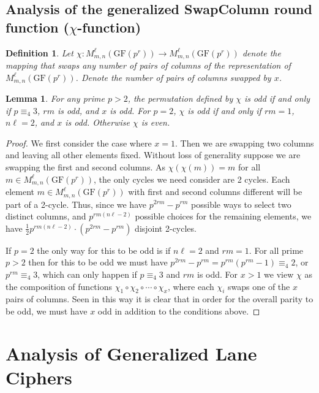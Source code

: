 \documentclass[11pt]{amsart}
\newcommand{\GF}{\mathrm{GF}}
\newtheorem{definition}{{\bf Definition}}
\newtheorem{lemma}[theorem]{{\bf Lemma }}
\begin{document}
\subsection{{\bf Analysis of the generalized SwapColumn round function} ($\chi$-function) }

\begin{definition}
Let $\chi : M^\ell_{m,n}(\GF(p^r)) \to M^\ell_{m,n}(\GF(p^r))$ denote the mapping that swaps any number of pairs of columns of the representation of $M^\ell_{m,n}(\GF(p^r))$. Denote the number of pairs of columns swapped by $x$.
\end{definition}

\begin{lemma}
For any prime $p > 2$, the permutation defined by $\chi$ is odd if and only if $p \equiv_4 3$, $rm$ is odd, and $x$ is odd. For $p = 2$, $\chi$ is odd if and only if $rm = 1$, $n\ell = 2$, and $x$ is odd. Otherwise $\chi$ is even.
\end{lemma}

\begin{proof}
We first consider the case where $x = 1$. Then we are swapping two columns and leaving all other elements fixed. Without loss of generality suppose we are swapping the first and second columns. As $\chi(\chi(m)) = m$ for all $m \in M^\ell_{m,n}(\GF(p^r))$, the only cycles we need consider are 2 cycles. Each element $m \in M^\ell_{m,n}(\GF(p^r))$ with first and second columns different will be part of a 2-cycle. Thus, since we have $p^{2rm} - p^{rm}$ possible ways to select two distinct columns, and $p^{rm(n\ell - 2)}$ possible choices for the remaining elements, we have $\frac{1}{2}p^{rm(n\ell - 2)} \cdot (p^{2rm} - p^{rm})$ disjoint 2-cycles.

If $p = 2$ the only way for this to be odd is if $n\ell = 2$ and $rm = 1$. For all prime $p > 2$ then for this to be odd we must have $p^{2rm} - p^{rm} = p^{rm}(p^{rm} - 1) \equiv_4 2$, or $p^{rm} \equiv_4 3$, which can only happen if $p \equiv_4 3$ and $rm$ is odd. For $x > 1$ we view $\chi$ as the composition of functions $\chi_1 \circ \chi_2 \circ \cdots \circ \chi_{x}$, where each $\chi_i$ swaps one of the $x$ pairs of columns. Seen in this way it is clear that in order for the overall parity to be odd, we must have $x$ odd in addition to the conditions above.
\end{proof}




\section{Analysis of Generalized Lane Ciphers}
\end{document}
